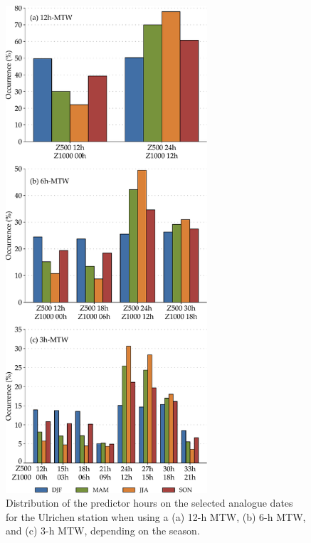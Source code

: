 \documentclass[hess, manuscript]{copernicus}
\begin{document}
	\begin{figure}[htb]
		\includegraphics[width=7.5cm]{fig07.pdf}
		\caption{Distribution of the predictor hours on the selected analogue dates for the Ulrichen station when using a (a) 12-h MTW, (b) 6-h MTW, and (c) 3-h MTW, depending on the season.}
		\label{fig:hours_selection_per_season}
	\end{figure}
	
\end{document}

